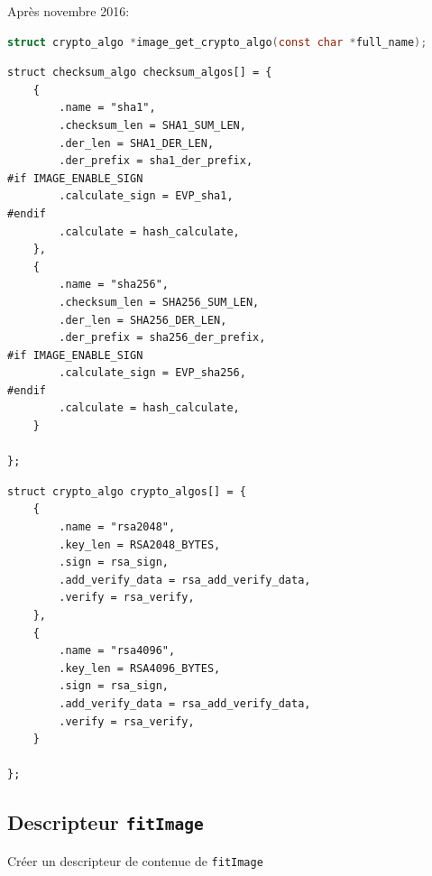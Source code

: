 \documentclass[aspectratio=169]{beamer}
\begin{document}
\begin{frame}[fragile]
Après novembre 2016:

\begin{lstlisting}[language=C,basicstyle=\tiny\ttfamily\color{white}]
struct crypto_algo *image_get_crypto_algo(const char *full_name);
\end{lstlisting}
{\setlength\multicolsep{0pt}
\begin{multicols}{2}
\begin{lstlisting}[style=shell,basicstyle=\tiny\ttfamily\color{white}]
struct checksum_algo checksum_algos[] = {
	{
		.name = "sha1",
		.checksum_len = SHA1_SUM_LEN,
		.der_len = SHA1_DER_LEN,
		.der_prefix = sha1_der_prefix,
#if IMAGE_ENABLE_SIGN
		.calculate_sign = EVP_sha1,
#endif
		.calculate = hash_calculate,
	},
	{
		.name = "sha256",
		.checksum_len = SHA256_SUM_LEN,
		.der_len = SHA256_DER_LEN,
		.der_prefix = sha256_der_prefix,
#if IMAGE_ENABLE_SIGN
		.calculate_sign = EVP_sha256,
#endif
		.calculate = hash_calculate,
	}

};
\end{lstlisting}
\columnbreak
\begin{lstlisting}[style=shell,basicstyle=\tiny\ttfamily\color{white}]
struct crypto_algo crypto_algos[] = {
	{
		.name = "rsa2048",
		.key_len = RSA2048_BYTES,
		.sign = rsa_sign,
		.add_verify_data = rsa_add_verify_data,
		.verify = rsa_verify,
	},
	{
		.name = "rsa4096",
		.key_len = RSA4096_BYTES,
		.sign = rsa_sign,
		.add_verify_data = rsa_add_verify_data,
		.verify = rsa_verify,
	}

};
\end{lstlisting}
\end{multicols}
}
\end{frame}


\subsection{Descripteur \texttt{fitImage}}

\begin{frame}
\begin{center}
\large{Créer un descripteur de contenue de \texttt{fitImage}}
\end{center}
\end{frame}
\end{document}
